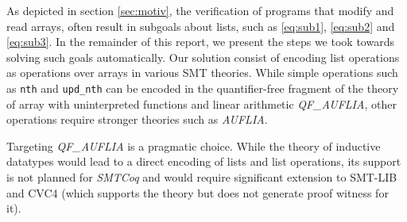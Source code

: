 \documentclass[onecolumn, preprint]{sigplanconf}
\begin{document}
As depicted in section \ref{sec:motiv}, the verification of programs that modify and read arrays, often result in subgoals about lists, such as \ref{eq:sub1}, \ref{eq:sub2} and \ref{eq:sub3}. In the remainder of this report, we present the steps we took towards solving such goals automatically. Our solution consist of encoding list operations as operations over arrays in various SMT theories. While simple operations such as \texttt{nth} and \texttt{upd\_nth} can be encoded in the quantifier-free fragment of the theory of array with uninterpreted functions and linear arithmetic \emph{QF\_AUFLIA}, other operations require stronger theories such as \emph{AUFLIA}. 

Targeting \emph{QF\_AUFLIA} is a pragmatic choice. While the theory of inductive datatypes would lead to a direct encoding of lists and list operations, its support is not planned for \emph{SMTCoq} and would require significant extension to SMT-LIB and CVC4 (which supports the theory but does not generate proof witness for it). 




\end{document}
